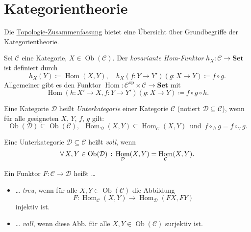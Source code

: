 \documentclass{cheat-sheet}
\newcommand{\SetC}{\mathbf{Set}} %
\newcommand{\op}{\mathrm{op}} %
\DeclareMathOperator{\Hom}{Hom} %
\newcommand{\Cat}{\mathcal{C}} %
\newcommand{\Dat}{\mathcal{D}} %
\DeclareMathOperator{\Ob}{Ob} %
\begin{document}




\section{Kategorientheorie}

\begin{bem}
  Die \href{http://timbaumann.info/uni-spicker/topo.pdf}{Topologie-Zusammenfassung} bietet eine Übersicht über Grundbegriffe der Kategorientheorie.
\end{bem}


\begin{defn}
  Sei $\Cat$ eine Kategorie, $X \in \Ob(\Cat)$. Der \emph{kovariante Hom-Funktor} $h_X : \Cat \to \SetC$ ist definiert durch
  \[
    h_X(Y) \coloneqq \Hom(X, Y), \quad
    h_X(f : Y \to Y')(g : X \to Y) \coloneqq f \circ g.
  \]
  Allgemeiner gibt es den Funktor $\Hom : \Cat^\op \times \Cat \to \SetC$ mit
  \[
    \Hom(h : X' \to X, f : Y \to Y')(g : X \to Y) \coloneqq f \circ g \circ h.
  \]
\end{defn}


\begin{defn}
  Eine Kategorie $\Dat$ heißt \emph{Unterkategorie} einer Kategorie $\Cat$ (notiert $\Dat \subseteq \Cat$), wenn für alle geeigneten $X$, $Y$, $f$, $g$ gilt:
  \[
    \Ob(\Dat) \subseteq \Ob(\Cat), \enspace
    \Hom_\Dat(X, Y) \subseteq \Hom_\Cat(X, Y) \enspace \text{und} \enspace
    f \circ_\Dat g = f \circ_\Cat g.
  \]
\end{defn}

\begin{defn}
  Eine Unterkategorie $\Dat \subseteq \Cat$ heißt \emph{voll}, wenn
  \[ \fa{X, Y \in \Ob(\Dat)} \Hom_\Dat(X, Y) = \Hom_\Cat(X, Y). \]
\end{defn}

\begin{defn}
  Ein Funktor $F : \Cat \to \Dat$ heißt \ldots
  \begin{itemize}
    \item \ldots{} \emph{treu}, wenn für alle $X, Y \in \Ob(\Cat)$ die Abbildung
    \[ F : \Hom_\Cat(X, Y) \to \Hom_\Dat(FX, FY) \]
    injektiv ist.
    \item \ldots{} \emph{voll}, wenn diese Abb. für alle $X, Y \in \Ob(\Cat)$ surjektiv ist.
  \end{itemize}
\end{defn}
\end{document}
